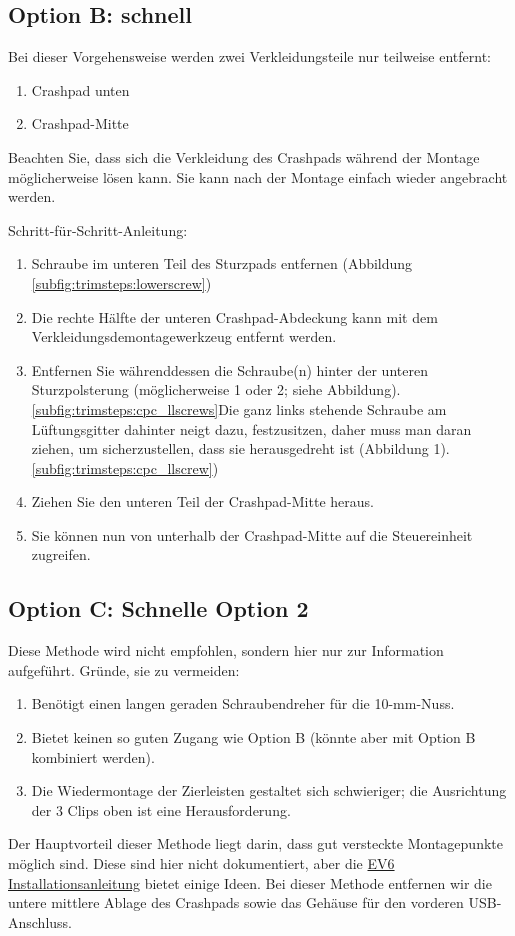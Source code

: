 \documentclass[superscriptaddress,onecolumn,floatfix]{revtex4-2}
\begin{document}
\subsection{Option B: schnell}
Bei dieser Vorgehensweise werden zwei Verkleidungsteile nur teilweise entfernt:
\begin{enumerate}
  \item Crashpad unten
  \item Crashpad-Mitte
\end{enumerate}
Beachten Sie, dass sich die Verkleidung des Crashpads während der Montage möglicherweise lösen kann. Sie kann nach der Montage einfach wieder angebracht werden.

Schritt-für-Schritt-Anleitung:
\begin{enumerate}
  \item Schraube im unteren Teil des Sturzpads entfernen (Abbildung \ref{subfig:trimsteps:lowerscrew})
  \item Die rechte Hälfte der unteren Crashpad-Abdeckung kann mit dem Verkleidungsdemontagewerkzeug entfernt werden. 
  \item Entfernen Sie währenddessen die Schraube(n) hinter der unteren Sturzpolsterung (möglicherweise 1 oder 2; siehe Abbildung). \ref{subfig:trimsteps:cpc_llscrews}Die ganz links stehende Schraube am Lüftungsgitter dahinter neigt dazu, festzusitzen, daher muss man daran ziehen, um sicherzustellen, dass sie herausgedreht ist (Abbildung 1). \ref{subfig:trimsteps:cpc_llscrew})
  \item Ziehen Sie den unteren Teil der Crashpad-Mitte heraus.
  \item Sie können nun von unterhalb der Crashpad-Mitte auf die Steuereinheit zugreifen.
\end{enumerate}

\subsection{Option C: Schnelle Option 2}

Diese Methode wird nicht empfohlen, sondern hier nur zur Information aufgeführt. Gründe, sie zu vermeiden:
\begin{enumerate}
  \item Benötigt einen langen geraden Schraubendreher für die 10-mm-Nuss.
  \item Bietet keinen so guten Zugang wie Option B (könnte aber mit Option B kombiniert werden).
  \item Die Wiedermontage der Zierleisten gestaltet sich schwieriger; die Ausrichtung der 3 Clips oben ist eine Herausforderung. 
\end{enumerate}
Der Hauptvorteil dieser Methode liegt darin, dass gut versteckte Montagepunkte möglich sind. Diese sind hier nicht dokumentiert, aber die \href{https://github.com/tylerharvey/Ioniq5_CAN/blob/main/guides/cars/E-GMP_gen1/EV6/head_unit_preconditioning_kit_EV6_install.pdf}{EV6 Installationsanleitung} bietet einige Ideen. Bei dieser Methode entfernen wir die untere mittlere Ablage des Crashpads sowie das Gehäuse für den vorderen USB-Anschluss. 
\end{document}
